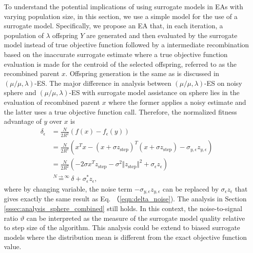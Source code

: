 To understand the potential implications of using surrogate models in EAs with varying population size, in this section, we use a simple model for the use of a surrogate model. Specifically, we propose an EA that, in each iteration, a population of $\lambda$ offspring $Y$ are generated and then evaluated by the surrogate model instead of true objective function followed by a intermediate recombination based on the inaccurate surrogate estimate where a true objective function evaluation is made for the centroid of the selected offspring, referred to as the recombined parent $x$. Offspring generation is the same as is discussed in $(\mu/\mu,\lambda)$-ES. The major difference in analysis between $(\mu/\mu,\lambda)$-ES on noisy sphere and $(\mu/\mu,\lambda)$-ES with surrogate model assistance on sphere lies in the evaluation of recombined parent $x$ where the former applies a noisy estimate and the latter uses a true objective function call. Therefore, the normalized fitness advantage of $y$ over $x$ is
\begin{align}
\delta_\epsilon &=  \frac{N}{2R^2}\left( f(x) - f_\epsilon(y)\right)  \nonumber\\ 
& = \frac{N}{2R^2} (x^Tx - (x+\sigma z_{\text{step}})^T (x+\sigma z_{\text{step}}) -\sigma_{y,\epsilon} z_{y,\epsilon}) \nonumber\\
& = \frac{N}{2R^2} (-2 \sigma x^Tz_{\text{step}} - \sigma^2 \Vert z_{\text{step}}\Vert^2 +\sigma_\epsilon z_\epsilon) \nonumber\\
&\overset{N \rightarrow \infty}{=} \delta+\sigma_\epsilon^* z_\epsilon, \label{eqn:delta_surrogate}{}
\end{align}
where by changing variable, the noise term $-\sigma_{y,\epsilon} z_{y,\epsilon}$ can be replaced by $\sigma_\epsilon z_\epsilon$ that gives exactly the same result as Eq. （\ref{eqn:delta_noise}). The analysis in Section \ref{sssec:analysis_sphere_combined} still holds. In this context, the noise-to-signal ratio $\vartheta$ can be interpreted as the measure of the surrogate model quality relative to step size of the algorithm. This analysis could be extend to biased surrogate models where the distribution mean is different from the exact objective function value\cite{DBLP:conf/ppsn/KayhaniA18}. 

